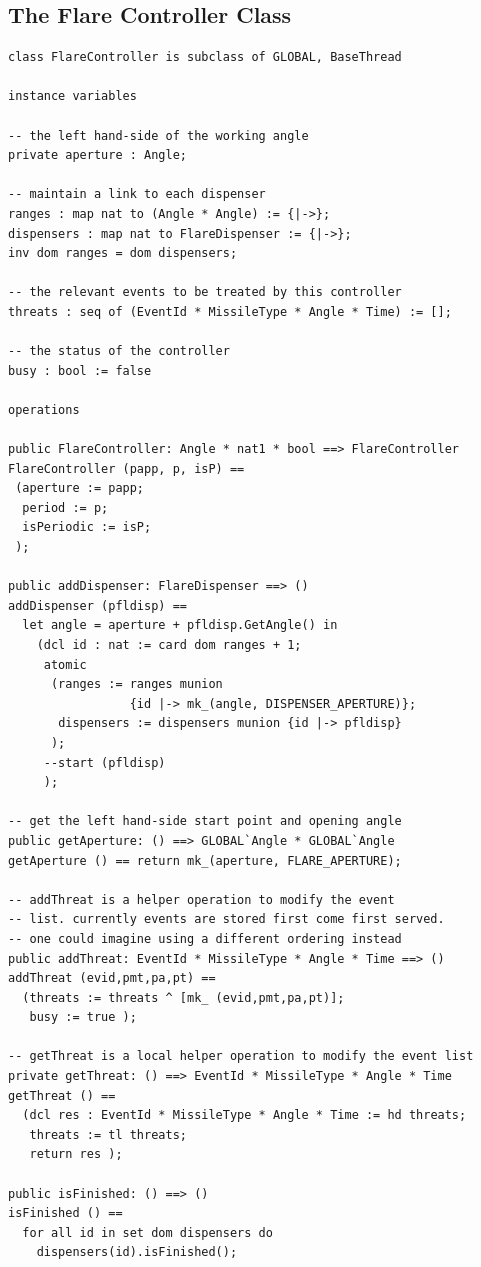 \documentclass{overturerepchap}
\begin{document}
\subsection{The Flare Controller Class}

\begin{lstlisting}
class FlareController is subclass of GLOBAL, BaseThread

instance variables

-- the left hand-side of the working angle
private aperture : Angle;

-- maintain a link to each dispenser
ranges : map nat to (Angle * Angle) := {|->};
dispensers : map nat to FlareDispenser := {|->};
inv dom ranges = dom dispensers;

-- the relevant events to be treated by this controller
threats : seq of (EventId * MissileType * Angle * Time) := [];

-- the status of the controller
busy : bool := false

operations

public FlareController: Angle * nat1 * bool ==> FlareController
FlareController (papp, p, isP) == 
 (aperture := papp;
  period := p;
  isPeriodic := isP;
 );

public addDispenser: FlareDispenser ==> ()
addDispenser (pfldisp) ==
  let angle = aperture + pfldisp.GetAngle() in
    (dcl id : nat := card dom ranges + 1;
     atomic
      (ranges := ranges munion 
                 {id |-> mk_(angle, DISPENSER_APERTURE)};
       dispensers := dispensers munion {id |-> pfldisp}
      );
     --start (pfldisp) 
     );

-- get the left hand-side start point and opening angle
public getAperture: () ==> GLOBAL`Angle * GLOBAL`Angle
getAperture () == return mk_(aperture, FLARE_APERTURE);

-- addThreat is a helper operation to modify the event
-- list. currently events are stored first come first served.
-- one could imagine using a different ordering instead
public addThreat: EventId * MissileType * Angle * Time ==> ()
addThreat (evid,pmt,pa,pt) ==
  (threats := threats ^ [mk_ (evid,pmt,pa,pt)];
   busy := true );

-- getThreat is a local helper operation to modify the event list
private getThreat: () ==> EventId * MissileType * Angle * Time
getThreat () ==
  (dcl res : EventId * MissileType * Angle * Time := hd threats;
   threats := tl threats;
   return res );

public isFinished: () ==> ()
isFinished () ==
  for all id in set dom dispensers do
    dispensers(id).isFinished();


\end{lstlisting}
\end{document}
